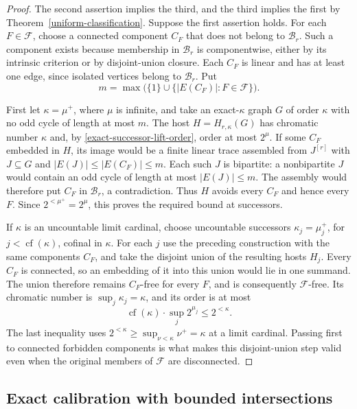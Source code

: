 \documentclass[a4paper,11pt,reqno]{amsart}
\theoremstyle{plain}
\theoremstyle{definition}
\theoremstyle{remark}
\begin{document}
\begin{proof}
The second assertion implies the third, and the third implies the
first by Theorem~\ref{uniform-classification}.
Suppose the first assertion holds.
For each $F\in\mathcal F$, choose a connected component $C_F$
that does not belong to $\mathcal B_r$.
Such a component exists because membership in $\mathcal B_r$ is
componentwise, either by its intrinsic criterion or by disjoint-union
closure.  Each $C_F$ is linear and has at least one edge, since
isolated vertices belong to $\mathcal B_r$.
Put
\[
 m=\max\bigl(\{1\}\cup
          \{|E(C_F)|:F\in\mathcal F\}\bigr).
\]

First let $\kappa=\mu^+$, where $\mu$ is infinite, and take an
exact-$\kappa$ graph $G$ of order $\kappa$ with no odd cycle of
length at most $m$.
The host $H=H_{r,\kappa}(G)$ has chromatic number $\kappa$ and,
by \eqref{exact-successor-lift-order}, order at most $2^\mu$.
If some $C_F$ embedded in $H$, its image would be a finite linear
trace assembled from $J^{[r]}$ with $J\subseteq G$ and
$|E(J)|\le|E(C_F)|\le m$.
Each such $J$ is bipartite: a nonbipartite $J$ would contain an odd
cycle of length at most $|E(J)|\le m$.
The assembly would therefore put $C_F$ in $\mathcal B_r$, a
contradiction.  Thus $H$ avoids every $C_F$ and hence every $F$.
Since $2^{<\mu^+}=2^\mu$, this proves the required bound at
successors.

If $\kappa$ is an uncountable limit cardinal, choose uncountable
successors $\kappa_j=\mu_j^+$, for $j<\operatorname{cf}(\kappa)$,
cofinal in $\kappa$.
For each $j$ use the preceding construction with the same components
$C_F$, and take the disjoint union of the resulting hosts $H_j$.
Every $C_F$ is connected, so an embedding of it into this union
would lie in one summand.  The union therefore remains $C_F$-free
for every $F$, and is consequently $\mathcal F$-free.
Its chromatic number is $\sup_j\kappa_j=\kappa$, and its order
is at most
\[
 \operatorname{cf}(\kappa)\cdot\sup_j2^{\mu_j}
 \le 2^{<\kappa}.
\]
The last inequality uses
$2^{<\kappa}\ge\sup_{\nu<\kappa}\nu^+=\kappa$ at a limit
cardinal.  Passing first to connected forbidden components is what
makes this disjoint-union step valid even when the original members
of $\mathcal F$ are disconnected.
\end{proof}

\subsection{Exact calibration with bounded intersections}
\label{exact-calibration}
\end{document}
